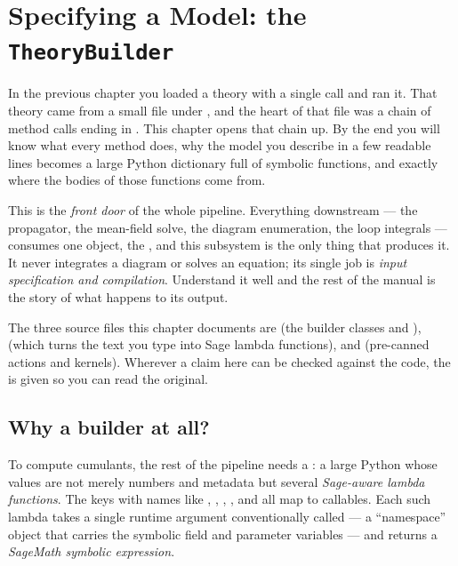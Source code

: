 \chapter{Specifying a Model: the \texttt{TheoryBuilder}}\label{ch:theory-spec}

In the previous chapter you loaded a theory with a single call and ran it. That
theory came from a small file under , and the heart of that file
was a chain of method calls ending in . This chapter opens that
chain up. By the end you will know what every method does, why the model you
describe in a few readable lines becomes a large Python dictionary full of
symbolic functions, and exactly where the bodies of those functions come from.

This is the \emph{front door} of the whole pipeline. Everything downstream ---
the propagator, the mean-field solve, the diagram enumeration, the loop integrals
--- consumes one object, the , and this subsystem is the only
thing that produces it. It never integrates a diagram or solves an equation; its
single job is \emph{input specification and compilation}. Understand it well and
the rest of the manual is the story of what happens to its output.

\begin{note}
The three source files this chapter documents are
 (the builder classes and ),
 (which turns the text you type into Sage
lambda functions), and  (pre-canned actions
and kernels). Wherever a claim here can be checked against the code, the
 is given so you can read the original.
\end{note}

\section{Why a builder at all?}

To compute cumulants, the rest of the pipeline needs a : a large
Python  whose values are not merely numbers and metadata but several
\emph{Sage-aware lambda functions}. The keys with names like ,
, , , and
 all map to callables. Each such lambda takes a single runtime
argument conventionally called  --- a ``namespace'' object that carries
the symbolic field and parameter variables --- and returns a \emph{SageMath
symbolic expression}.

